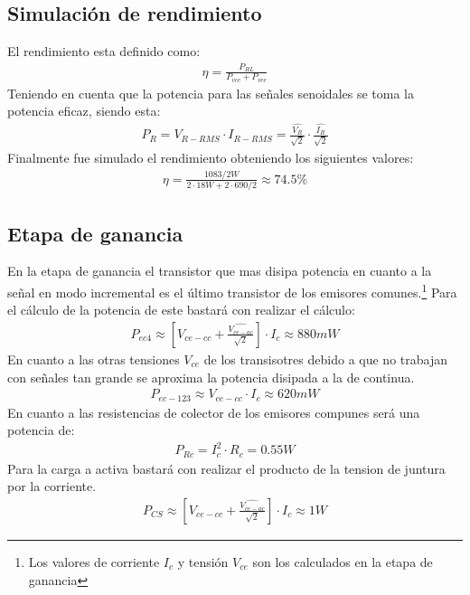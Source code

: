 




\subsection{Simulación de  rendimiento}
El rendimiento esta definido como:
\begin{align}
\eta = \frac{P_{RL}}{P_{vcc}+P_{vee}}
\end{align}
Teniendo en cuenta que la potencia para las señales senoidales se toma la potencia eficaz, siendo esta:
\begin{align}
P_{R}=V_{R-RMS}\cdot I_{R-RMS} =\frac{\hat{V_{R}}}{\sqrt{2}} \cdot \frac{\hat{I_{R}}}{\sqrt{2}}
\end{align}
Finalmente fue simulado el rendimiento obteniendo los siguientes valores:
\begin{align}
\eta=\frac{1083 / 2 W}{ 2\cdot 18 W + 2 \cdot 690 /2}\approx 74.5 \%
\end{align}
\subsection{Etapa de ganancia}
En la etapa de ganancia el transistor que mas disipa potencia en cuanto a la señal en modo incremental es el último transistor de los emisores comunes.\footnote{Los valores de corriente $I_c$ y tensión $V_{ce}$ son los calculados en la etapa de ganancia}
Para el cálculo de la potencia de este bastará con realizar el cálculo:
\begin{align}
P_{ec4}\approx\left[V_{ce-cc} + \frac{\hat{V_{ce-ac}}}{\sqrt{2}}\right]\cdot I_c\approx 880mW
\end{align}
En cuanto a las otras tensiones $V_{ce}$ de los transisotres debido a que no trabajan con señales tan grande se aproxima la potencia disipada a la de continua.
\begin{align}
P_{ec-123}\approx V_{ce-cc} \cdot I_c \approx 620mW
\end{align}
En cuanto a las resistencias de colector de los emisores compunes será una potencia de:
\begin{align}
P_{Rc}= I_c^2 \cdot R_c= 0.55 W
\end{align}
 Para la carga a activa bastará con realizar el producto de la tension de juntura por la corriente.
\begin{align}
P_{CS}\approx\left[V_{ce-cc} + \frac{\hat{V_{ce-ac}}}{\sqrt{2}}\right]\cdot I_c\approx 1W
\end{align}

